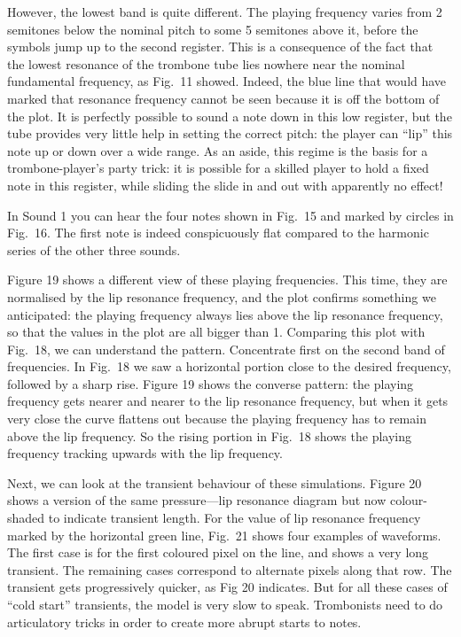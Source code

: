   However, the lowest band is quite different. The playing frequency varies 
  from 2 semitones below the nominal pitch to some 5 semitones above it, before 
  the symbols jump up to the second register. This is a consequence of the fact 
  that the lowest resonance of the trombone tube lies nowhere near the nominal 
  fundamental frequency, as Fig.\ 11 showed. Indeed, the blue line that would 
  have marked that resonance frequency cannot be seen because it is off the 
  bottom of the plot. It is perfectly possible to sound a note down in this low 
  register, but the tube provides very little help in setting the correct 
  pitch: the player can “lip” this note up or down over a wide range. As an 
  aside, this regime is the basis for a trombone-player’s party trick: it is 
  possible for a skilled player to hold a fixed note in this register, while 
  sliding the slide in and out with apparently no effect! 

  In Sound 1 you can hear the four notes shown in Fig.\ 15 and marked by 
  circles in Fig.\ 16. The first note is indeed conspicuously flat compared to 
  the harmonic series of the other three sounds. 

  Figure 19 shows a different view of these playing frequencies. This time, 
  they are normalised by the lip resonance frequency, and the plot confirms 
  something we anticipated: the playing frequency always lies above the lip 
  resonance frequency, so that the values in the plot are all bigger than 1. 
  Comparing this plot with Fig.\ 18, we can understand the pattern. Concentrate 
  first on the second band of frequencies. In Fig.\ 18 we saw a horizontal 
  portion close to the desired frequency, followed by a sharp rise. Figure 19 
  shows the converse pattern: the playing frequency gets nearer and nearer to 
  the lip resonance frequency, but when it gets very close the curve flattens 
  out because the playing frequency has to remain above the lip frequency. So 
  the rising portion in Fig.\ 18 shows the playing frequency tracking upwards 
  with the lip frequency. 

  Next, we can look at the transient behaviour of these simulations. Figure 20 
  shows a version of the same pressure—lip resonance diagram but now 
  colour-shaded to indicate transient length. For the value of lip resonance 
  frequency marked by the horizontal green line, Fig.\ 21 shows four examples 
  of waveforms. The first case is for the first coloured pixel on the line, and 
  shows a very long transient. The remaining cases correspond to alternate 
  pixels along that row. The transient gets progressively quicker, as Fig 20 
  indicates. But for all these cases of “cold start” transients, the model is 
  very slow to speak. Trombonists need to do articulatory tricks in order to 
  create more abrupt starts to notes. 


